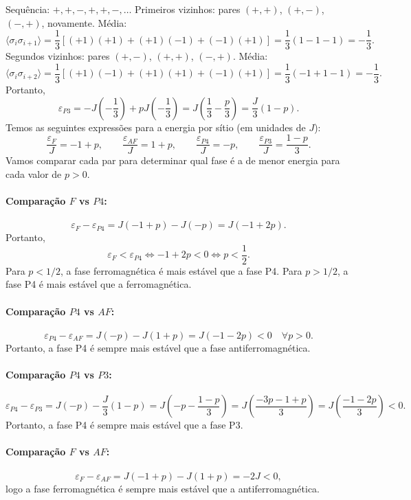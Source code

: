 \documentclass[11pt,a4paper]{article}
\begin{document}
\begin{itemize}
%
Sequência: \(+, +, -, +, +, -, \dots\)
%
Primeiros vizinhos: pares \((+,+)\), \((+,-)\), \((-,+)\), novamente. Média:
  \[
  \langle \sigma_i \sigma_{i+1} \rangle = \frac{1}{3} \left[ (+1)(+1) + (+1)(-1) + (-1)(+1) \right]
  = \frac{1}{3} (1 - 1 - 1) = -\frac{1}{3}.
  \]
%
Segundos vizinhos: pares \((+, -)\), \((+ , +)\), \((- , +)\). Média:
  \[
  \langle \sigma_i \sigma_{i+2} \rangle = \frac{1}{3} \left[ (+1)(-1) + (+1)(+1) + (-1)(+1) \right]
  = \frac{1}{3} (-1 + 1 - 1) = -\frac{1}{3}.
  \]
%
Portanto,
%
\begin{equation}
    \varepsilon_{P3} = -J\left(-\frac{1}{3}\right) + pJ\left(-\frac{1}{3}\right)
    = J\left( \frac{1}{3} - \frac{p}{3} \right)
    = \frac{J}{3}(1 - p).
    \label{eq:eps_P3}
\end{equation}
%
Temos as seguintes expressões para a energia por sítio (em unidades de \(J\)):
%
\[
\frac{\varepsilon_F}{J} = -1 + p,
\qquad
\frac{\varepsilon_{AF}}{J} = 1 + p,
\qquad
\frac{\varepsilon_{P4}}{J} = -p,
\qquad
\frac{\varepsilon_{P3}}{J} = \frac{1 - p}{3}.
\]
%
Vamos comparar cada par para determinar qual fase é a de menor energia para cada valor de \(p > 0\).
%
\paragraph{Comparação \(F\) vs \(P4\):}
%
\[
\varepsilon_F - \varepsilon_{P4} = J(-1 + p) - J(-p) = J(-1 + 2p).
\]
%
Portanto,
%
\[
\varepsilon_F < \varepsilon_{P4} \iff -1 + 2p < 0 \iff p < \frac{1}{2}.
\]
%
Para \(p < 1/2\), a fase ferromagnética é mais estável que a fase P4. Para \(p > 1/2\), a fase P4 é mais estável que a ferromagnética.
%
\paragraph{Comparação \(P4\) vs \(AF\):}
%
\[
\varepsilon_{P4} - \varepsilon_{AF} = J(-p) - J(1+p) = J(-1 - 2p) < 0 \quad \forall p > 0.
\]
%
Portanto, a fase P4 é sempre mais estável que a fase antiferromagnética.
%
\paragraph{Comparação \(P4\) vs \(P3\):}
\[
\varepsilon_{P4} - \varepsilon_{P3} = J(-p) - \frac{J}{3}(1-p)
= J\left( -p - \frac{1-p}{3} \right)
= J\left( \frac{-3p - 1 + p}{3} \right)
= J\left( \frac{-1 - 2p}{3} \right) < 0.
\]
%
Portanto, a fase P4 é sempre mais estável que a fase P3.
%
\paragraph{Comparação \(F\) vs \(AF\):}
%
\[
\varepsilon_F - \varepsilon_{AF} = J(-1+p) - J(1+p) = -2J < 0,
\]
%
logo a fase ferromagnética é sempre mais estável que a antiferromagnética.
%

\end{itemize}
\end{document}
